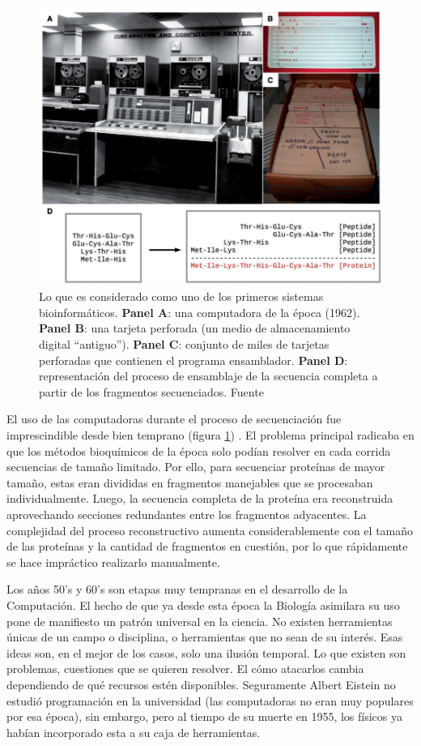 \begin{figure}[h]
   \centering
   \includegraphics[width=0.7\columnwidth]{images/COMPROTEIN.png}
   \caption{
       Lo que es considerado como uno de los primeros sistemas bioinformáticos.
       \textbf{Panel A}: una computadora de la época (1962).
       \textbf{Panel B}: una tarjeta perforada (un medio de almacenamiento digital ``antiguo'').
       \textbf{Panel C}: conjunto de miles de tarjetas perforadas que contienen el programa ensamblador.
       \textbf{Panel D}: representación del proceso de ensamblaje de la secuencia completa a partir de los fragmentos secuenciados.
       Fuente \cite{gauthierBriefHistoryBioinformatics2019}}
   \label{fig:COMPROTEIN}
\end{figure}
 
El uso de las computadoras durante el proceso de secuenciación fue imprescindible desde bien temprano (figura \ref{fig:COMPROTEIN}) \cite{dayhoffAComputerProgram1962}.
El problema principal radicaba en que los métodos bioquímicos de la época solo podían resolver en cada corrida secuencias de tamaño limitado.
Por ello, para secuenciar proteínas de mayor tamaño, estas eran divididas en fragmentos manejables que se procesaban individualmente.
Luego, la secuencia completa de la proteína era reconstruida aprovechando secciones redundantes entre los fragmentos adyacentes.
La complejidad del proceso reconstructivo aumenta considerablemente con el tamaño de las proteínas y la cantidad de fragmentos en cuestión, por lo que rápidamente se hace impráctico realizarlo manualmente.

Los años 50's y 60's son etapas muy tempranas en el desarrollo de la Computación.
El hecho de que ya desde esta época la Biología asimilara su uso pone de manifiesto un patrón universal en la ciencia.
No existen herramientas únicas de un campo o disciplina, o herramientas que no sean de su interés.
Esas ideas son, en el mejor de los casos, solo una ilusión temporal.
Lo que existen son problemas, cuestiones que se quieren resolver.
El cómo atacarlos cambia dependiendo de qué recursos estén disponibles.
Seguramente Albert Eistein no estudió programación en la universidad (las computadoras no eran muy populares por esa época), sin embargo, pero al tiempo de su muerte en 1955, los físicos ya habían incorporado esta a su caja de herramientas.

